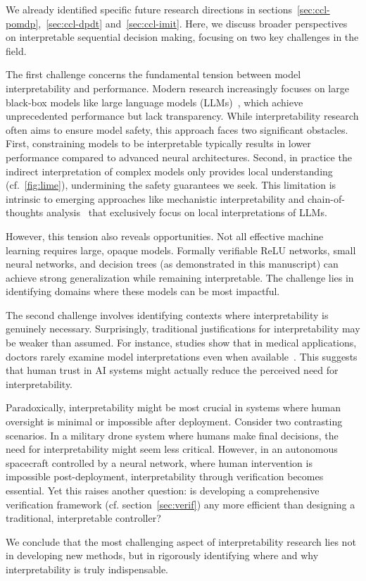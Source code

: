 We already identified specific future research directions in sections~\ref{sec:ccl-pomdp},~\ref{sec:ccl-dpdt} and~\ref{sec:ccl-imit}. Here, we discuss broader perspectives on interpretable sequential decision making, focusing on two key challenges in the field.

The first challenge concerns the fundamental tension between model interpretability and performance. Modern research increasingly focuses on large black-box models like large language models (LLMs)~\cite{all-you-need}, which achieve unprecedented performance but lack transparency. While interpretability research often aims to ensure model safety, this approach faces two significant obstacles. First, constraining models to be interpretable typically results in lower performance compared to advanced neural architectures. Second, in practice the indirect interpretation of complex models only provides local understanding (cf.~\ref{fig:lime}), undermining the safety guarantees we seek. This limitation is intrinsic to emerging approaches like mechanistic interpretability and chain-of-thoughts analysis~\cite{barez-chain-2025} that exclusively focus on local interpretations of LLMs.

However, this tension also reveals opportunities. Not all effective machine learning requires large, opaque models. Formally verifiable ReLU networks, small neural networks, and decision trees (as demonstrated in this manuscript) can achieve strong generalization while remaining interpretable. The challenge lies in identifying domains where these models can be most impactful.

The second challenge involves identifying contexts where interpretability is genuinely necessary. Surprisingly, traditional justifications for interpretability may be weaker than assumed. For instance, studies show that in medical applications, doctors rarely examine model interpretations even when available~\cite{festor}. This suggests that human trust in AI systems might actually reduce the perceived need for interpretability.

Paradoxically, interpretability might be most crucial in systems where human oversight is minimal or impossible after deployment. Consider two contrasting scenarios. In a military drone system where humans make final decisions, the need for interpretability might seem less critical. However, in an autonomous spacecraft controlled by a neural network, where human intervention is impossible post-deployment, interpretability through verification becomes essential. Yet this raises another question: is developing a comprehensive verification framework (cf. section~\ref{sec:verif}) any more efficient than designing a traditional, interpretable controller?

We conclude that the most challenging aspect of interpretability research lies not in developing new methods, but in rigorously identifying where and why interpretability is truly indispensable.
